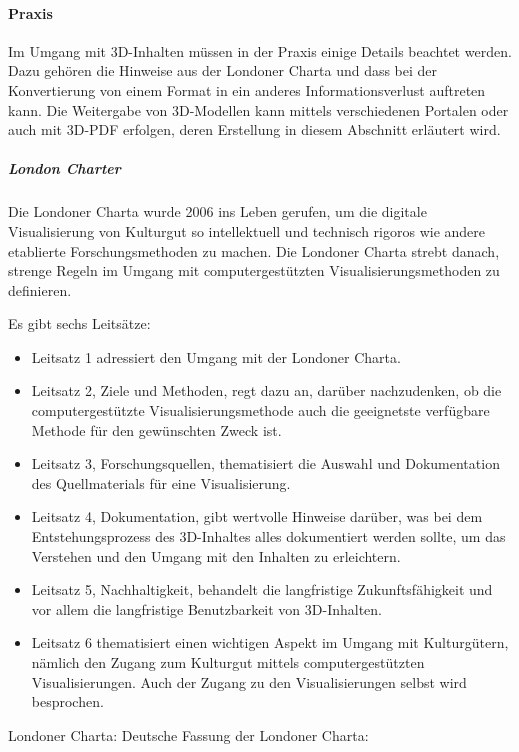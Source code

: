 \paragraph{Praxis}
Im Umgang mit 3D-Inhalten müssen in der Praxis einige Details beachtet werden. Dazu gehören die Hinweise aus der Londoner Charta und dass bei der Konvertierung von einem Format in ein anderes Informationsverlust auftreten kann. Die Weitergabe von 3D-Modellen kann mittels verschiedenen Portalen oder auch mit 3D-PDF erfolgen, deren Erstellung in diesem Abschnitt erläutert wird.

\subparagraph{London Charter} Die Londoner Charta wurde 2006 ins Leben gerufen, um die digitale Visualisierung von Kulturgut so intellektuell und technisch rigoros wie andere etablierte Forschungsmethoden zu machen. Die Londoner Charta strebt danach, strenge Regeln im Umgang mit computergestützten Visualisierungsmethoden zu definieren. 

\begin{flushleft}
Es gibt sechs Leitsätze: 

\begin{itemize}
\item Leitsatz 1 adressiert den Umgang mit der Londoner Charta.
\item Leitsatz 2, Ziele und Methoden, regt dazu an, darüber nachzudenken, ob die computergestützte Visualisierungsmethode auch die geeignetste verfügbare Methode für den gewünschten Zweck ist. 
\item Leitsatz 3, Forschungsquellen, thematisiert die Auswahl und Dokumentation des Quellmaterials für eine Visualisierung.
\item Leitsatz 4, Dokumentation, gibt wertvolle Hinweise darüber, was bei dem Entstehungsprozess des 3D-Inhaltes alles dokumentiert werden sollte, um das Verstehen und den Umgang mit den Inhalten zu erleichtern. 
\item Leitsatz 5, Nachhaltigkeit, behandelt die langfristige Zukunftsfähigkeit und vor allem die langfristige Benutzbarkeit von 3D-Inhalten.
\item Leitsatz 6 thematisiert einen wichtigen Aspekt im Umgang mit Kulturgütern, nämlich den Zugang zum Kulturgut mittels computergestützten Visualisierungen. Auch der Zugang zu den Visualisierungen selbst wird besprochen.
\end{itemize}

	Londoner Charta: 
	Deutsche Fassung der Londoner Charta: 
\end{flushleft}

